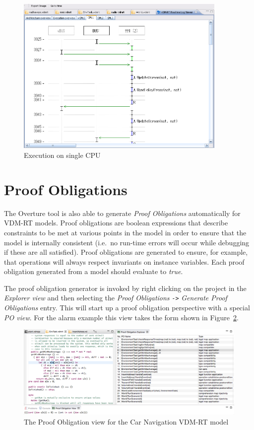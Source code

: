 \begin{figure}[htp]
\begin{center}
  \includegraphics[width=4in]{figures/ExecutionCPU}
  \caption{Execution on single CPU}
  \label{fig:userguide:ExecutionCPU}
\end{center}
\end{figure}

\section{Proof Obligations}\label{sec:PO}

The Overture tool is also able to generate \emph{Proof Obligations}
automatically for VDM-RT models. Proof obligations are boolean
expressions that describe constraints to be met at various points in
the model in order to ensure that the model is internally consistent
(i.e.\ no run-time errors will occur while debugging if these are all
satisfied). Proof obligations are generated to ensure, for example,
that operations will always respect invariants on instance
variables. Each proof obligation generated from a model should
evaluate to \emph{true}.

The proof obligation generator is invoked by right clicking on the
project in the \emph{Explorer view} and then selecting the \emph{Proof
  Obligations} \texttt{->} \emph{Generate Proof Obligations}
entry. This will start up a proof obligation perspective with a
special \emph{PO view}. For the alarm example this view takes the form
shown in Figure~\ref{fig:POview}.

\begin{figure}[htbp]
\begin{center}
\includegraphics[width=4.5in]{figures/poviewRT}
\caption{The Proof Obligation view for the Car Navigation VDM-RT model\label{fig:POview}}
\end{center}
\end{figure}

